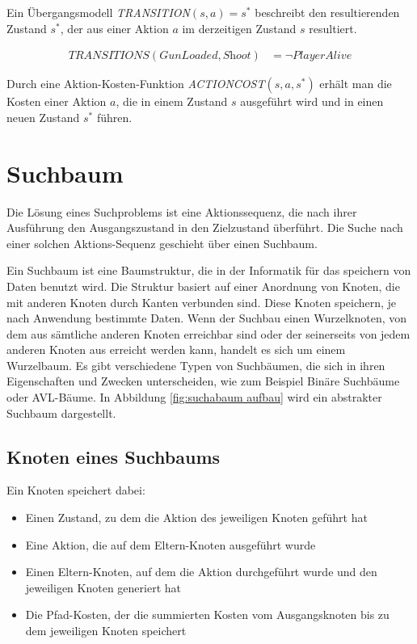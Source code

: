 Ein \"{U}bergangsmodell \textit{TRANSITION}$(s,a) = s^*$ beschreibt den resultierenden Zustand $s^*$, der aus einer Aktion $a$ im derzeitigen Zustand $s$ resultiert.

\begin{align}
	\textit{TRANSITIONS}(\textit{GunLoaded}, \textit{Shoot}) &= \lnot \textit{PlayerAlive}
\end{align}

Durch eine Aktion-Kosten-Funktion \textit{ACTIONCOST}$(s,a,s^*)$ erh\"{a}lt man die Kosten einer Aktion $a$, die in einem Zustand $s$ ausgef\"{u}hrt wird und in einen neuen Zustand $s^*$ f\"{u}hren.

\section{Suchbaum}
\label{chap:suchbaum}

Die L\"{o}sung eines Suchproblems ist eine Aktionssequenz, die nach ihrer Ausf\"{u}hrung den Ausgangszustand in den Zielzustand \"{u}berf\"{u}hrt. Die Suche nach einer solchen Aktions-Sequenz geschieht \"{u}ber einen Suchbaum.

Ein Suchbaum ist eine Baumstruktur, die in der Informatik f\"{u}r das speichern von Daten benutzt wird. Die Struktur basiert auf einer Anordnung von Knoten, die mit anderen Knoten durch Kanten verbunden sind. Diese Knoten speichern, je nach Anwendung bestimmte Daten. Wenn der Suchbau einen Wurzelknoten, von dem aus s\"{a}mtliche anderen Knoten erreichbar sind oder der seinerseits von jedem anderen Knoten aus erreicht werden kann, handelt es sich um einem Wurzelbaum. Es gibt verschiedene Typen von Suchb\"{a}umen, die sich in ihren Eigenschaften und Zwecken unterscheiden, wie zum Beispiel Bin\"{a}re Suchb\"{a}ume oder AVL-B\"{a}ume. In Abbildung \ref{fig:suchabaum aufbau} wird ein abstrakter Suchbaum dargestellt.

\subsection{Knoten eines Suchbaums}
\label{chap: knoten eines suchbaums}

Ein Knoten speichert dabei:
\begin{itemize}
	\item Einen Zustand, zu dem die Aktion des jeweiligen Knoten gef\"{u}hrt hat
	\item Eine Aktion, die auf dem Eltern-Knoten ausgef\"{u}hrt wurde
	\item Einen Eltern-Knoten, auf dem die Aktion durchgef\"{u}hrt wurde und den jeweiligen Knoten generiert hat
	\item Die Pfad-Kosten, der die summierten Kosten vom Ausgangsknoten bis zu dem jeweiligen Knoten speichert
\end{itemize}

